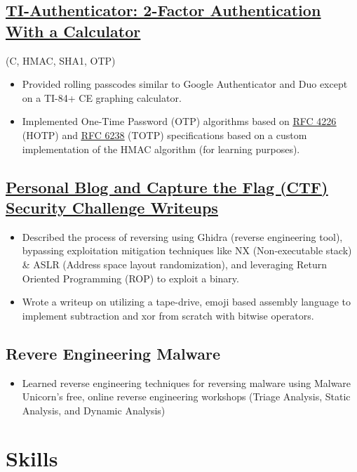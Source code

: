 \documentclass{article}
\begin{document}
\subsection{\href{https://youtu.be/DLzxrzFCyOs}{\underline{TI-Authenticator: 2-Factor Authentication With a Calculator}}} \hfill (C, HMAC, SHA1, OTP)
\begin{itemize}
    \item Provided rolling passcodes similar to Google Authenticator and Duo except on a TI-84+ CE graphing calculator.
    \item Implemented One-Time Password (OTP) algorithms based on \href{https://tools.ietf.org/html/rfc4226}{\underline{RFC 4226}} (HOTP) and \href{https://tools.ietf.org/html/rfc6238}{\underline{RFC 6238}} (TOTP) specifications based on a custom implementation of the HMAC algorithm (for learning purposes).
\end{itemize}

\subsection{\href{https://youtu.be/DLzxrzFCyOs}{ \underline{Personal Blog and Capture the Flag (CTF) Security Challenge Writeups}}}
\begin{itemize}
    \item Described the process of reversing using Ghidra (reverse engineering tool), bypassing exploitation mitigation techniques like NX (Non-executable stack) \& ASLR (Address space layout randomization), and leveraging Return Oriented Programming (ROP) to exploit a binary.
    \item Wrote a writeup on utilizing a tape-drive, emoji based assembly language to implement subtraction and xor from scratch with bitwise operators.
\end{itemize}

\subsection{Revere Engineering Malware}
\begin{itemize}
    \item Learned reverse engineering techniques for reversing malware using Malware Unicorn's free, online reverse engineering workshops (Triage Analysis, Static Analysis, and Dynamic Analysis)
\end{itemize}

\section{Skills}
\end{document}
